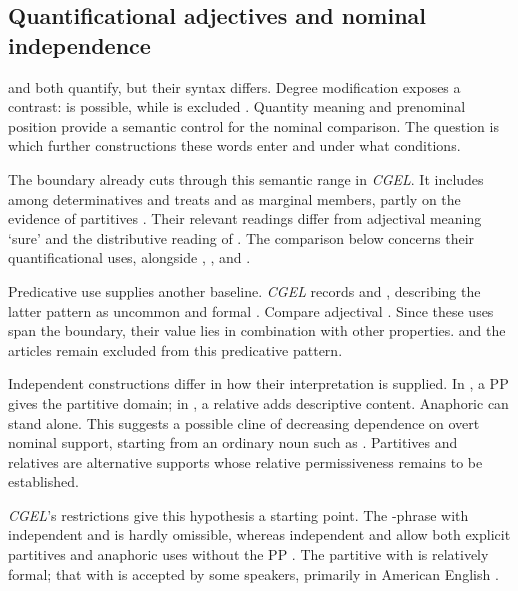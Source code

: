 \documentclass[12pt]{article}
\begin{document}
\subsection{Quantificational adjectives and nominal independence}\label{sec:quant-controls}

 and  both quantify, but their syntax differs. Degree modification exposes a contrast:  is possible, while  is excluded \citep[539--540]{huddleston2002}. Quantity meaning and prenominal position provide a semantic control for the nominal comparison. The question is which further constructions these words enter and under what conditions.

The boundary already cuts through this semantic range in \textit{CGEL}. It includes  among determinatives and treats  and  as marginal members, partly on the evidence of partitives \citep[392--393]{huddleston2002}. Their relevant readings differ from adjectival  meaning ‘sure’ and the distributive reading of . The comparison below concerns their quantificational uses, alongside , , and .

Predicative use supplies another baseline. \textit{CGEL} records  and , describing the latter pattern as uncommon and formal \citep[392, 395--396]{huddleston2002}. Compare adjectival . Since these uses span the boundary, their value lies in combination with other properties.  and the articles remain excluded from this predicative pattern.

Independent constructions differ in how their interpretation is supplied. In , a PP gives the partitive domain; in , a relative adds descriptive content. Anaphoric  can stand alone. This suggests a possible cline of decreasing dependence on overt nominal support, starting from an ordinary noun such as . Partitives and relatives are alternative supports whose relative permissiveness remains to be established.

\textit{CGEL}'s restrictions give this hypothesis a starting point. The -phrase with independent  and  is hardly omissible, whereas independent  and  allow both explicit partitives and anaphoric uses without the PP \citep[392, 411--413]{huddleston2002}. The partitive with  is relatively formal; that with  is accepted by some speakers, primarily in American English \citep[393]{huddleston2002}.
\end{document}
